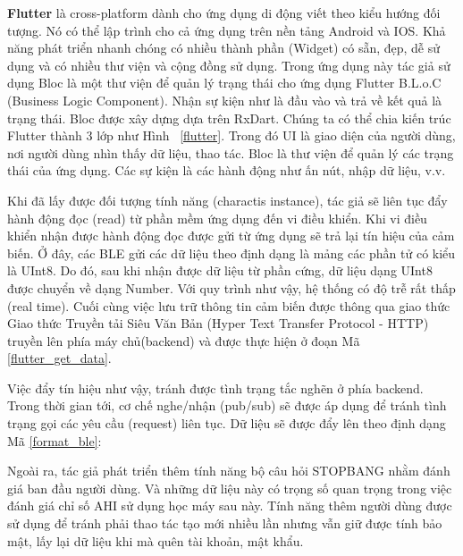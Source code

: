 

\textbf{Flutter} là cross-platform dành cho ứng dụng di động viết theo kiểu hướng đối tượng. Nó có thể lập trình cho cả ứng dụng trên nền tảng Android và IOS. Khả năng phát triển nhanh chóng có nhiều thành phần (Widget) có sẵn, đẹp, dễ sử dụng và có nhiều thư viện và cộng đồng sử dụng. Trong ứng dụng này tác giả sử dụng Bloc là một thư viện để quản lý trạng thái cho ứng dụng Flutter B.L.o.C (Business Logic Component). Nhận sự kiện như là đầu vào và trả về kết quả là trạng thái. Bloc được xây dựng dựa trên RxDart. Chúng ta có thể chia kiến trúc Flutter thành 3 lớp như Hình ~\ref{flutter}. Trong đó UI là giao diện của người dùng, nơi người dùng nhìn thấy dữ liệu, thao tác. Bloc là thư viện để quản lý các trạng thái của ứng dụng. Các sự kiện là các hành động như ấn nút, nhập dữ liệu, v.v.




Khi đã lấy được đối tượng tính năng (charactis instance), tác giả sẽ liên tục đẩy  hành động đọc (read) từ phần mềm ứng dụng đến vi điều khiển. Khi vi điều khiển nhận được hành động đọc được gửi từ ứng dụng sẽ trả lại tín hiệu của cảm biến. Ở đây, các BLE gửi các dữ liệu theo định dạng là mảng các phần tử có kiểu là UInt8. Do đó, sau khi nhận được dữ liệu từ phần cứng, dữ liệu dạng UInt8 được chuyển về dạng Number. Với quy trình như vậy, hệ thống có độ trễ rất thấp (real time). Cuối cùng việc lưu trữ thông tin cảm biến được thông qua giao thức Giao thức Truyền tải Siêu Văn Bản (Hyper Text Transfer Protocol - HTTP) truyền lên phía máy chủ(backend) và được thực hiện ở đoạn Mã \ref{flutter_get_data}.

Việc đẩy tín hiệu như vậy, tránh được tình trạng tắc nghẽn ở phía backend. Trong thời gian tới, cơ chế nghe/nhận (pub/sub) sẽ được áp dụng để tránh tình trạng gọi các yêu cầu (request) liên tục. Dữ liệu sẽ được đẩy lên theo định dạng Mã \ref{format_ble}:

Ngoài ra, tác giả phát triển thêm tính năng bộ câu hỏi STOPBANG nhằm đánh giá ban đầu người dùng. Và những dữ liệu này có trọng số quan trọng trong việc đánh giá chỉ số AHI sử dụng học máy sau này. Tính năng thêm người dùng được sử dụng để tránh phải thao tác tạo mới nhiều lần nhưng vẫn giữ được tính bảo mật, lấy lại dữ liệu khi mà quên tài khoản, mật khẩu.



